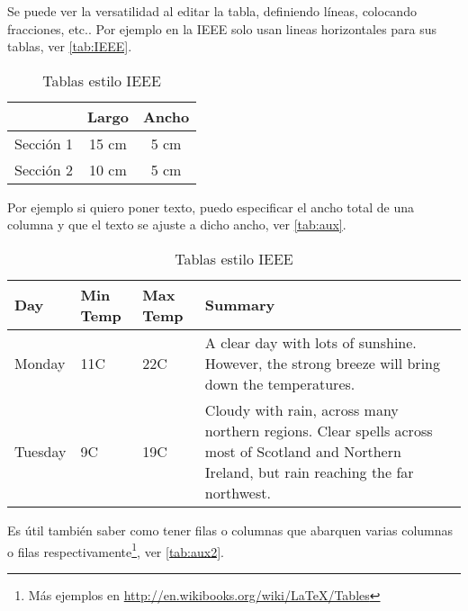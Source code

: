 \documentclass[a4paper,12pt]{article} %
\begin{document}
	Se puede ver la versatilidad al editar la tabla, definiendo líneas, colocando fracciones, etc.. Por ejemplo en la IEEE solo usan lineas horizontales para sus tablas, ver \autoref{tab:IEEE}.
	\begin{table}[h!]
	\renewcommand{\arraystretch}{1.3}
	\caption{Tablas estilo IEEE}
	\label{tab:IEEE}
	\centering
	\begin{tabular}{c c c }
	\hline
	 & Largo & Ancho \\
	\hline
	Sección 1 & 15 cm & 5 cm\\
	Sección 2 & 10 cm & 5 cm\\
	\end{tabular}
	\end{table}

	
	Por ejemplo si quiero poner texto, puedo especificar el ancho total de una columna y que el texto se ajuste a dicho ancho, ver \autoref{tab:aux}.
	\begin{table}[h!]
		\renewcommand{\arraystretch}{1.3}
		\caption{Tablas estilo IEEE}
		\label{tab:aux}
		\centering
		\begin{tabular}{ | l | l | l | p{5cm} |}
			\hline
			Day & Min Temp & Max Temp & Summary \\ \hline
			Monday & 11C & 22C & A clear day with lots of sunshine.  
			However, the strong breeze will bring down the temperatures. \\ \hline
			Tuesday & 9C & 19C & Cloudy with rain, across many northern regions. Clear spells
			across most of Scotland and Northern Ireland,
			but rain reaching the far northwest. \\ 
			\hline
		\end{tabular}
	\end{table}

\newpage

	Es útil también saber como tener filas o columnas que abarquen varias columnas o filas respectivamente\footnote{Más ejemplos en \url{http://en.wikibooks.org/wiki/LaTeX/Tables}}, ver \autoref{tab:aux2}.
	
\end{document}
